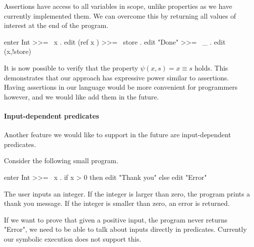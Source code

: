 Assertions have access to all variables in scope, unlike properties as we have currently implemented them.
We can overcome this by returning all values of interest at the end of the program.
\begin{TASK}
  enter Int >>= \ x . edit (ref x ) >>= \ store . edit "Done" >>= \ _ . edit (x,!store)
\end{TASK}
It is now possible to verify that the property $\psi(x,s) = x \equiv s$ holds.
This demonstrates that our approach has expressive power similar to assertions.
Having assertions in our language would be more convenient for programmers however, and we would like add them in the future.



\paragraph{Input-dependent predicates}

Another feature we would like to support in the future are input-dependent predicates.

\begin{example}
  Consider the following small program.

  \begin{TASK}
    enter Int >>= \ x . if x > 0 then edit "Thank you" else edit "Error"
  \end{TASK}

  The user inputs an integer.
  If the integer is larger than zero, the program prints a thank you message.
  If the integer is smaller than zero, an error is returned.
\end{example}

If we want to prove that given a positive input, the program never returns "Error", we need to be able to talk about inputs directly in predicates.
Currently our symbolic execution does not support this.
